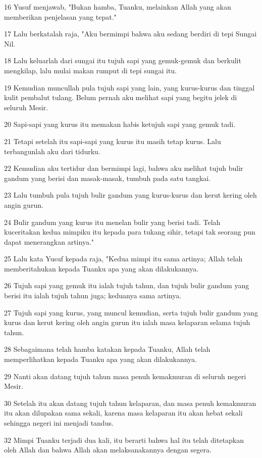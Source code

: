 \par 16 Yusuf menjawab, "Bukan hamba, Tuanku, melainkan Allah yang akan memberikan penjelasan yang tepat."
\par 17 Lalu berkatalah raja, "Aku bermimpi bahwa aku sedang berdiri di tepi Sungai Nil.
\par 18 Lalu keluarlah dari sungai itu tujuh sapi yang gemuk-gemuk dan berkulit mengkilap, lalu mulai makan rumput di tepi sungai itu.
\par 19 Kemudian muncullah pula tujuh sapi yang lain, yang kurus-kurus dan tinggal kulit pembalut tulang. Belum pernah aku melihat sapi yang begitu jelek di seluruh Mesir.
\par 20 Sapi-sapi yang kurus itu memakan habis ketujuh sapi yang gemuk tadi.
\par 21 Tetapi setelah itu sapi-sapi yang kurus itu masih tetap kurus. Lalu terbangunlah aku dari tidurku.
\par 22 Kemudian aku tertidur dan bermimpi lagi, bahwa aku melihat tujuh bulir gandum yang berisi dan masak-masak, tumbuh pada satu tangkai.
\par 23 Lalu tumbuh pula tujuh bulir gandum yang kurus-kurus dan kerut kering oleh angin gurun.
\par 24 Bulir gandum yang kurus itu menelan bulir yang berisi tadi. Telah kuceritakan kedua mimpiku itu kepada para tukang sihir, tetapi tak seorang pun dapat menerangkan artinya."
\par 25 Lalu kata Yusuf kepada raja, "Kedua mimpi itu sama artinya; Allah telah memberitahukan kepada Tuanku apa yang akan dilakukannya.
\par 26 Tujuh sapi yang gemuk itu ialah tujuh tahun, dan tujuh bulir gandum yang berisi itu ialah tujuh tahun juga; keduanya sama artinya.
\par 27 Tujuh sapi yang kurus, yang muncul kemudian, serta tujuh bulir gandum yang kurus dan kerut kering oleh angin gurun itu ialah masa kelaparan selama tujuh tahun.
\par 28 Sebagaimana telah hamba katakan kepada Tuanku, Allah telah memperlihatkan kepada Tuanku apa yang akan dilakukannya.
\par 29 Nanti akan datang tujuh tahun masa penuh kemakmuran di seluruh negeri Mesir.
\par 30 Setelah itu akan datang tujuh tahun kelaparan, dan masa penuh kemakmuran itu akan dilupakan sama sekali, karena masa kelaparan itu akan hebat sekali sehingga negeri ini menjadi tandus.
\par 32 Mimpi Tuanku terjadi dua kali, itu berarti bahwa hal itu telah ditetapkan oleh Allah dan bahwa Allah akan melaksanakannya dengan segera.
